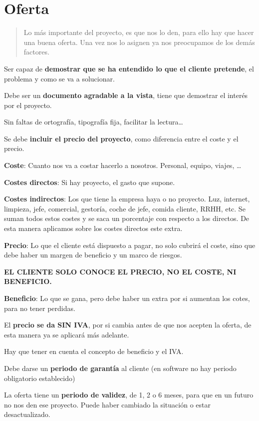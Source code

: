 \documentclass[12pt]{report} %
\begin{document}
\section{Oferta}

\begin{quote}
Lo más importante del proyecto, es que nos lo den, para ello hay que
hacer una buena oferta. Una vez nos lo asignen ya nos preocupamos de los
demás factores.
\end{quote}

Ser capaz de \textbf{demostrar que se ha entendido lo que el cliente
pretende}, el problema y como se va a solucionar.

Debe ser un \textbf{documento agradable a la vista}, tiene que demostrar
el interés por el proyecto.

Sin faltas de ortografía, tipografía fija, facilitar la lectura\ldots{}

Se debe \textbf{incluir el precio del proyecto}, como diferencia entre
el coste y el precio.

\textbf{Coste}: Cuanto nos va a costar hacerlo a nosotros. Personal,
equipo, viajes, \ldots{}

\textbf{Costes directos}: Si hay proyecto, el gasto que supone.

\textbf{Costes indirectos}: Los que tiene la empresa haya o no proyecto.
Luz, internet, limpieza, jefe, comercial, gestoría, coche de jefe,
comida cliente, RRHH, etc. Se suman todos estos costes y se saca un
porcentaje con respecto a los directos. De esta manera aplicamos sobre
los costes directos este extra.

\textbf{Precio}: Lo que el cliente está dispuesto a pagar, no solo
cubrirá el coste, sino que debe haber un margen de beneficio y un marco
de riesgos.

\textbf{EL CLIENTE SOLO CONOCE EL PRECIO, NO EL COSTE, NI BENEFICIO.}

\textbf{Beneficio}: Lo que se gana, pero debe haber un extra por si
aumentan los cotes, para no tener perdidas.

El \textbf{precio se da SIN IVA}, por si cambia antes de que nos acepten
la oferta, de esta manera ya se aplicará más adelante.

Hay que tener en cuenta el concepto de beneficio y el IVA.

Debe darse un \textbf{periodo de garantía} al cliente (en software no
hay periodo obligatorio establecido)

La oferta tiene un \textbf{periodo de validez}, de 1, 2 o 6 meses, para
que en un futuro no nos den ese proyecto. Puede haber cambiado la
situación o estar desactualizado.
\end{document}
